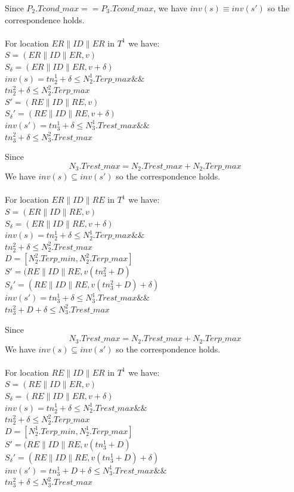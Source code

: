 Since $P_2.Tcond\_max==P_3.Tcond\_max$, we have $inv(s)\equiv inv(s')$ so the correspondence holds.\\
\\
For location $ER\| ID\| ER$ in $T^1$ we have:\\
$S=(ER\| ID\| ER,v)$\\
$S_\delta=(ER\| ID\| ER,v+\delta)$\\
$inv(s)=tn_2^1+\delta\leq N_2^1.Terp\_max \&\&$\\
$tn_2^2+\delta\leq N_2^2.Terp\_max$\\
$S'=(RE\| ID\| RE,v)$\\
$S_\delta '=(RE\| ID\| RE,v+\delta)$\\
$inv(s')=tn_3^1+\delta\leq N_3^1.Trest\_max \&\&$\\
$tn_3^2+\delta\leq N_3^2.Trest\_max$

Since $$N_3.Trest\_max = N_2.Trest\_max+N_2.Terp\_max$$
We have $inv(s)\subseteq inv(s')$ so the correspondence holds.\\
\\
For location $ER\| ID\| RE$ in $T^1$ we have:\\
$S=(ER\| ID\| RE,v)$\\
$S_\delta=(ER\| ID\| RE,v+\delta)$\\
$inv(s)=tn_2^1+\delta\leq N_2^1.Terp\_max \&\&$\\
$tn_2^2+\delta\leq N_2^2.Trest\_max$\\
$D=[N_2^2.Terp\_min,N_2^2.Terp\_max]$\\
$S'=(RE\| ID\| RE,v(tn_3^2+D)$\\
$S_\delta '=(RE\| ID\| RE,v(tn_3^2+D)+\delta)$\\
$inv(s')=tn_3^1+\delta\leq N_3^1.Trest\_max \&\&$\\
$tn_3^2+D+\delta\leq N_3^2.Trest\_max$

Since $$N_3.Trest\_max = N_2.Trest\_max+N_2.Terp\_max$$
We have $inv(s)\subseteq inv(s')$ so the correspondence holds.\\
\\
For location $RE\| ID\| ER$ in $T^1$ we have:\\
$S=(RE\| ID\| ER,v)$\\
$S_\delta=(RE\| ID\| ER,v+\delta)$\\
$inv(s)=tn_2^1+\delta\leq N_2^1.Trest\_max \&\&$\\
$tn_2^2+\delta\leq N_2^2.Terp\_max$\\
$D=[N_2^1.Terp\_min,N_2^1.Terp\_max]$\\
$S'=(RE\| ID\| RE,v(tn_3^1+D)$\\
$S_\delta '=(RE\| ID\| RE,v(tn_3^1+D)+\delta)$\\
$inv(s')=tn_3^1+D+\delta\leq N_3^1.Trest\_max \&\&$\\
$tn_3^2+\delta\leq N_3^2.Trest\_max$

